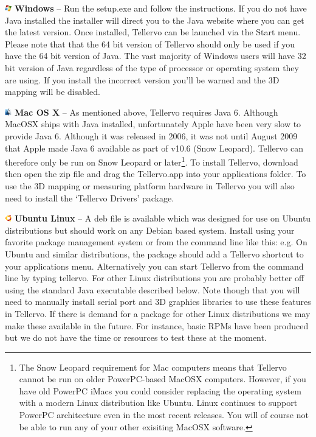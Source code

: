 \begin{description}
\item \includegraphics[width=3mm]{Images/windows.png} \textbf{Windows} -- Run the setup.exe and follow the instructions. If you do not have Java installed the installer will direct you to the Java website where you can get the latest version. Once installed, Tellervo can be launched via the Start menu.  Please note that that the 64 bit version of Tellervo should only be used if you have the 64 bit version of Java.  The vast majority of Windows users will have 32 bit version of Java regardless of the type of processor or operating system they are using. If you install the incorrect version you'll be warned and the 3D mapping will be disabled.

\item \includegraphics[width=3mm]{Images/mac.png} \textbf{Mac OS X} -- As mentioned above, Tellervo requires Java 6. Although MacOSX ships with Java installed, unfortunately Apple have been very slow to provide Java 6. Although it was released in 2006, it was not until August 2009 that Apple made Java 6 available as part of v10.6 (Snow Leopard). Tellervo can therefore only be run on Snow Leopard or later\footnote{The Snow Leopard requirement for Mac computers means that Tellervo cannot be run on older PowerPC-based MacOSX computers.  However, if you have old PowerPC iMacs you could consider replacing the operating system with a modern Linux distribution like Ubuntu.  Linux continues to support PowerPC architecture even in the most recent releases.  You will of course not be able to run any of your other exisiting MacOSX software.}. To install Tellervo, download then open the zip file and drag the Tellervo.app into your applications folder.  To use the 3D mapping or measuring platform hardware in Tellervo you will also need to install the `Tellervo Drivers' package.  

\item \includegraphics[width=3mm]{Images/ubuntu.png} \textbf{Ubuntu Linux} --  A deb file is available which was designed for use on Ubuntu distributions but should work on any Debian based system. Install using your favorite package management system or from the command line like this: e.g.  On Ubuntu and similar distributions, the package should add a Tellervo shortcut to your applications menu. Alternatively you can start Tellervo from the command line by typing tellervo.  For other Linux distributions you are probably better off using the standard Java executable described below.  Note though that you will need to manually install serial port and 3D graphics libraries to use these features in Tellervo.  If there is demand for a package for other Linux distributions we may make these available in the future.  For instance, basic RPMs have been produced but we do not have the time or resources to test these at the moment.


\end{description}
